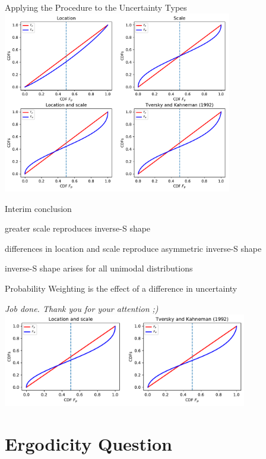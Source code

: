 \begin{frame}{Applying the Procedure to the Uncertainty Types}
\centering
	\includegraphics[width=0.75\textwidth]{../../figs/Gauss_scale_location_both_KT.pdf}
	\label{LocationScale}
\end{frame}

\begin{frame}{Interim conclusion}
\bi
	\item greater scale reproduces inverse-S shape
	\item differences in location and scale reproduce asymmetric inverse-S shape
	\item inverse-S shape arises for all unimodal distributions
	\item Probability Weighting is the effect of a difference in uncertainty
	\item[]
	\item[] \textit{Job done. Thank you for your attention ;)}
	\hfill
	\hyperlink{FunctionalForms}{}
	\label{InterimConclusion}
\ei
	\vspace{2em}
	\centering
	\includegraphics[width=0.8\textwidth]{../../figs/Our_result_LocScale_vs_KT.pdf}
\end{frame}

\section{Ergodicity Question}

